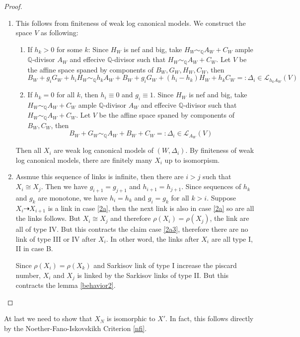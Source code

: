 \documentclass{article}
\begin{document}
\begin{proof}
\begin{enumerate}
  \item This follows from finiteness of weak log canonical models. We construct the space $V$ as following: 
\begin{enumerate}
  \item If $h_{k}>0$ for some $k$: Since $H_{W}$ is nef and big,  take  $H_{W}\sim_{\mathbb{Q}}A_{W}+C_{W}$  ample $\mathbb{Q}$-divisor $A_{W}$ and effecive $\mathbb{Q}$-divisor such that $H_{W}\sim_{\mathbb{Q}}A_{W}+C_{W}$. Let $V$ be the affine space spaned by components of  $B_{W},G_{W},H_{W},C_{W}$, then 
    \[
      B_{W}+g_{i}G_{W}+h_{i}H_{W}\sim_{\mathbb{Q}} h_{k}A_{W}+B_{W}+g_{i}G_{W}+(h_{i}-h_{k})H_{W}+h_{k}C_{W}=:\Delta_{i} \in \mathcal{L}_{h_{k}A_{W}}(V)
    \]
  \item If $h_{k}=0$ for all $k$, then $h_{i}\equiv 0$ and $g_{i}\equiv 1$.  Since $H_{W}$ is nef and big,  take  $H_{W}\sim_{\mathbb{Q}}A_{W}+C_{W}$  ample $\mathbb{Q}$-divisor $A_{W}$ and effecive $\mathbb{Q}$-divisor such that $H_{W}\sim_{\mathbb{Q}}A_{W}+C_{W}$. Let $V$ be the affine space spaned by components of  $B_{W},C_{W}$, then 
    \[
      B_{W}+G_{W}\sim_{\mathbb{Q}} A_{W}+B_{W}+C_{W}=:\Delta_{i} \in \mathcal{L}_{A_{W}}(V)
    \]
\end{enumerate}
Then all $X_{i}$ are weak log canonical models of $(W,\Delta_{i})$. By finiteness of weak log canonical models, there are finitely many $X_{i}$ up to isomorpism.
\item Assmue this sequence of links is infinite, then there are $i>j$ such that $X_{i}\cong X_{j}$. Then we have $g_{i+1}=g_{j+1}$ and $h_{i+1}=h_{j+1}$. Since sequences of $h_{k}$ and $g_{k}$ are monotone, we have $h_{i}=h_{k}$ and  $g_{i}=g_{k}$ for all $k>i$. Suppose $X_{i}\dashrightarrow X_{i+1}$ is a link in case \ref{2a}, then the next link is also in case \ref{2a}  so are all the links follows. But $X_{i}\cong X_{j}$ and therefore $\rho(X_{i})=\rho(X_{j})$, the link are all of type IV. But this contracts the claim case \ref{2a3}, therefore there are no link of type III or IV after $X_{i}$. In other word, the links after $X_{i}$ are all type I, II in case B.

  Since $\rho(X_{i})= \rho(X_{k})$ and Sarkisov link of type I increase the piscard number, $X_{i}$  and $X_{j}$ is linked by  the Sarkisov links of type II. But this contracts the lemma \ref{behavior2}.
\end{enumerate}  
\end{proof}
At last we need to show that $X_{N}$ is isomorphic to $X'$. In fact, this follows directly by the Noether-Fano-Iskovskikh Criterion \ref{nfi}.
\end{document}
